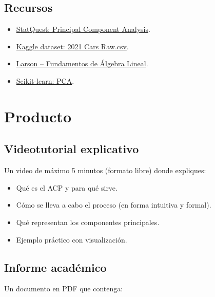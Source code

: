 \documentclass[a4,11pt]{aleph-notas}
\begin{document}
\subsection*{Recursos}
\begin{itemize}[leftmargin=*]
\item \href{https://youtu.be/FgakZw6K1QQ}{StatQuest: Principal Component Analysis}.
\item \href{https://www.kaggle.com/datasets/konradb/real-world-vehicle-emissions}{Kaggle dataset: 2021 Cars Raw.csv}.
\item \href{https://catalogobiblioteca.puce.edu.ec/cgi-bin/koha/opac-detail.pl?biblionumber=86081}{Larson – Fundamentos de Álgebra Lineal}.
\item \href{https://scikit-learn.org/stable/modules/generated/sklearn.decomposition.PCA.html}{Scikit-learn: PCA}.
\end{itemize}

\section*{Producto}

\subsection{Videotutorial explicativo}

Un video de máximo 5 minutos (formato libre) donde expliques:
\begin{itemize}[leftmargin=*]
\item Qué es el ACP y para qué sirve.
\item Cómo se lleva a cabo el proceso (en forma intuitiva y formal).
\item Qué representan los componentes principales.
\item Ejemplo práctico con visualización.
\end{itemize}

\subsection{Informe académico}

Un documento en PDF que contenga:
\end{document}
